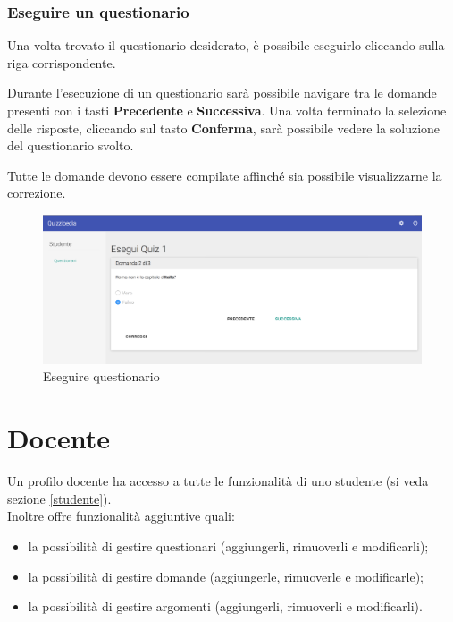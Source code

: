 \documentclass[12pt,a4paper]{article}
\begin{document}
	\subsubsection{Eseguire un questionario}
	\par Una volta trovato il questionario desiderato, è possibile eseguirlo cliccando sulla riga corrispondente. \\
	\par Durante l'esecuzione di un questionario sarà possibile navigare tra le domande presenti con i tasti \textbf{Precedente} e \textbf{Successiva}.
	Una volta terminato la selezione delle risposte, cliccando sul tasto \textbf{Conferma}, sarà possibile vedere la soluzione del questionario svolto. \\
	\par Tutte le domande devono essere compilate affinché sia possibile visualizzarne la correzione. \\
	
	\begin{figure}[H]	
		\centering
		\includegraphics[width=1.0\linewidth]{../img/screenshot/esecuzioneQuestionario.png}
		\caption{Eseguire questionario}
		\label{Eseguire questionario}
	\end{figure}
	
	\section{Docente}\label{docente}
	Un profilo docente ha accesso a tutte le funzionalità di uno studente (si veda sezione \ref{studente}). \\
		Inoltre offre funzionalità aggiuntive quali:
		\begin{itemize}
			\item la possibilità di gestire questionari (aggiungerli, rimuoverli e modificarli);
			\item la possibilità di gestire domande (aggiungerle, rimuoverle e modificarle);
			\item la possibilità di gestire argomenti (aggiungerli, rimuoverli e modificarli).
		\end{itemize}
\end{document}
